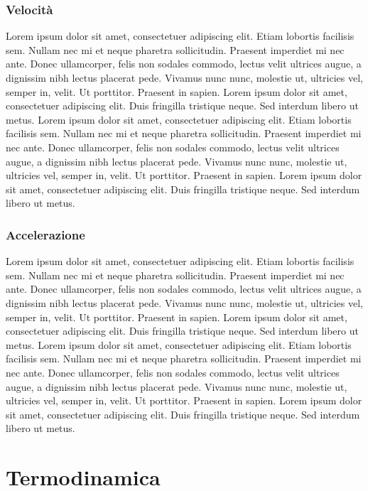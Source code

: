 \documentclass{book}
\begin{document}
\section{Velocità}
Lorem ipsum dolor sit amet, consectetuer adipiscing elit. Etiam lobortis facilisis
sem. Nullam nec mi et neque pharetra sollicitudin. Praesent imperdiet mi nec
ante. Donec ullamcorper, felis non sodales commodo, lectus velit ultrices augue,
a dignissim nibh lectus placerat pede. Vivamus nunc nunc, molestie ut, ultricies
vel, semper in, velit. Ut porttitor. Praesent in sapien. Lorem ipsum dolor sit
amet, consectetuer adipiscing elit. Duis fringilla tristique neque. Sed interdum
libero ut metus.
Lorem ipsum dolor sit amet, consectetuer adipiscing elit. Etiam lobortis facilisis
sem. Nullam nec mi et neque pharetra sollicitudin. Praesent imperdiet mi nec
ante. Donec ullamcorper, felis non sodales commodo, lectus velit ultrices augue,
a dignissim nibh lectus placerat pede. Vivamus nunc nunc, molestie ut, ultricies
vel, semper in, velit. Ut porttitor. Praesent in sapien. Lorem ipsum dolor sit
amet, consectetuer adipiscing elit. Duis fringilla tristique neque. Sed interdum
libero ut metus. 

\section{Accelerazione}
Lorem ipsum dolor sit amet, consectetuer adipiscing elit. Etiam lobortis facilisis
sem. Nullam nec mi et neque pharetra sollicitudin. Praesent imperdiet mi nec
ante. Donec ullamcorper, felis non sodales commodo, lectus velit ultrices augue,
a dignissim nibh lectus placerat pede. Vivamus nunc nunc, molestie ut, ultricies
vel, semper in, velit. Ut porttitor. Praesent in sapien. Lorem ipsum dolor sit
amet, consectetuer adipiscing elit. Duis fringilla tristique neque. Sed interdum
libero ut metus.
Lorem ipsum dolor sit amet, consectetuer adipiscing elit. Etiam lobortis facilisis
sem. Nullam nec mi et neque pharetra sollicitudin. Praesent imperdiet mi nec
ante. Donec ullamcorper, felis non sodales commodo, lectus velit ultrices augue,
a dignissim nibh lectus placerat pede. Vivamus nunc nunc, molestie ut, ultricies
vel, semper in, velit. Ut porttitor. Praesent in sapien. Lorem ipsum dolor sit
amet, consectetuer adipiscing elit. Duis fringilla tristique neque. Sed interdum
libero ut metus. 




\part{Termodinamica}
\end{document}

